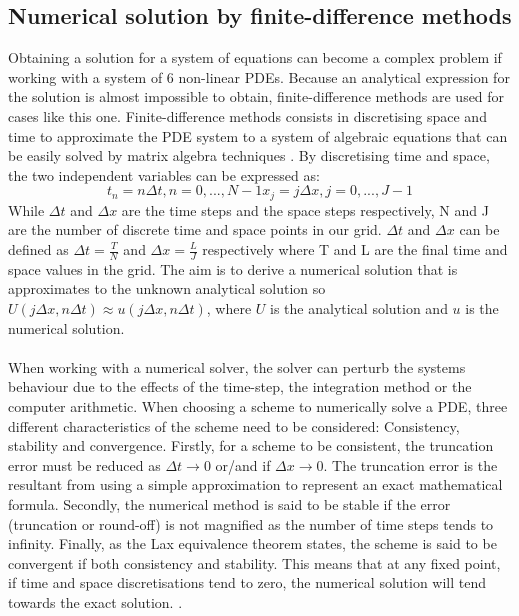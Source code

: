 \subsection{Numerical solution by finite-difference methods}
Obtaining a solution for a system of equations can become a complex problem if working with a system of 6 non-linear PDEs. Because an analytical expression for the solution is almost impossible to obtain, finite-difference methods are used for cases like this one. Finite-difference methods consists in discretising space and time to approximate the PDE system to a system of algebraic equations that can be easily solved by matrix algebra techniques \parencite{Morton1994}. By discretising time and space, the two independent variables can be expressed as:
\begin{subequations}
    \begin{equation}
        t_{n} = n\Delta t, n=0,...,N-1
    \end{equation}
    \begin{equation}
        x_{j} = j\Delta x, j=0,...,J-1
    \end{equation}
\end{subequations}
While $\Delta t$ and $\Delta x$ are the time steps and the space steps respectively, N and J are the number of discrete time and space points in our grid. $\Delta t$ and $\Delta x$ can be defined as $ \Delta t = \frac{T}{N}$ and $   \Delta x= \frac{L}{J}$ respectively where T and L are the final time and space values in the grid. The aim is to derive a numerical solution that is approximates to the unknown analytical solution so $U(j\Delta x, n\Delta t)\approx u( j\Delta x, n\Delta t)$, where $U$ is the analytical solution and $u$ is the numerical solution. \\\\
When working with a numerical solver, the solver can perturb the systems behaviour due to the effects of the time-step, the integration method or the computer arithmetic. When choosing a scheme to numerically solve a PDE, three different characteristics of the scheme need to be considered: Consistency, stability and convergence. Firstly, for a scheme to be consistent, the truncation error must be reduced as $\Delta t \rightarrow 0$ or/and if $\Delta x \rightarrow 0$. The truncation error is the resultant from using a simple approximation to represent an exact mathematical formula. Secondly, the numerical method is said to be stable if the error (truncation or round-off) is not magnified as the number of time steps tends to infinity. Finally, as the Lax equivalence theorem states, the scheme is said to be convergent if both consistency and stability. This means that at any fixed point, if  time and space discretisations tend to zero, the numerical solution will tend towards the exact solution. \parencite{smith1985numerical}.\\\\
